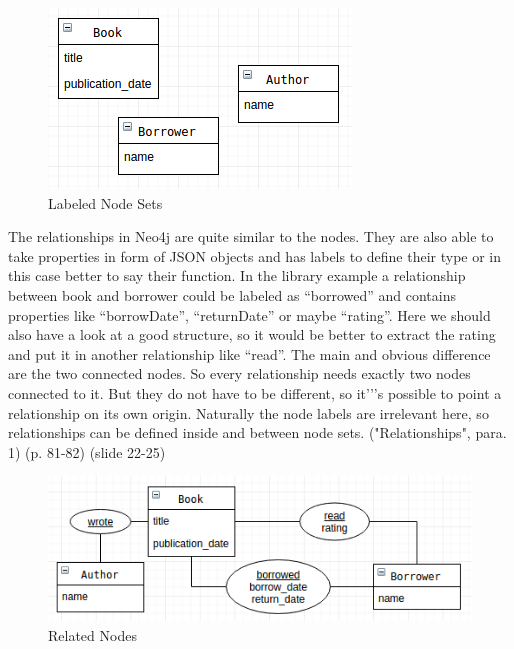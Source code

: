 \begin{figure}[H]
	\includegraphics[width=\linewidth,keepaspectratio]{images/neo4j/data-structure/labeled-nodes.png}
	\caption{Labeled Node Sets}
\end{figure}

The relationships in Neo4j are quite similar to the nodes. They are also able to take properties in form of JSON objects and has labels to define their type or in this case better to say their function. In the library example a relationship between book and borrower could be labeled as “borrowed” and contains properties like “borrowDate”, “returnDate” or maybe “rating”. Here we should also have a look at a good structure, so it would be better to extract the rating and put it in another relationship like “read”.
The main and obvious difference are the two connected nodes. So every relationship needs exactly two nodes connected to it. But they do not have to be different, so it'’'s possible to point a relationship on its own origin. Naturally the node labels are irrelevant here, so relationships can be defined inside and between node sets.
\cite{NeoTechnology2017c.2017c} ("Relationships", para. 1) \cite{Gupta.2015} (p. 81-82) \cite{Hunger.2013} (slide 22-25)

\begin{figure}[H]
	\includegraphics[width=\linewidth,keepaspectratio]{images/neo4j/data-structure/node-relationships.png}
	\caption{Related Nodes}
\end{figure}

